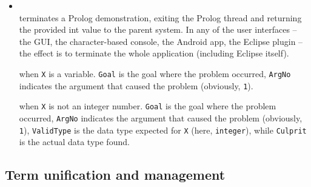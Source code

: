 \begin{itemize}
\item {}\\
    \noindent{} terminates a Prolog demonstration, exiting the
    Prolog thread and returning the provided int value to the parent system.
    In any of the \tuprolog{} user interfaces -- the GUI, the character-based console, the Android app, the Eclipse plugin -- the effect is to terminate the whole application (including Eclipse itself).


     when \texttt{X} is a variable. \texttt{Goal} is the goal where the problem occurred, \texttt{ArgNo} indicates the argument that caused the problem (obviously, \texttt{1}).

     when \texttt{X} is not an integer number. \texttt{Goal} is the goal where the problem occurred, \texttt{ArgNo} indicates the argument that caused the problem (obviously, \texttt{1}), \texttt{ValidType} is the data type expected for \texttt{X} (here, \texttt{integer}), while \texttt{Culprit} is the actual data type found.

\end{itemize}

\subsection{Term unification and management}
\label{ssec:term-unification-and-management}

